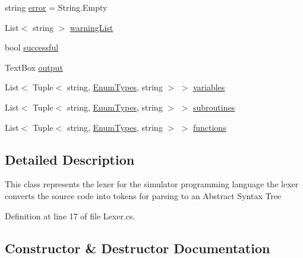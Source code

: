 \begin{DoxyCompactItemize}
\item 
string \hyperlink{class_c_p_u___o_s___simulator_1_1_compiler_1_1_frontend_1_1_lexer_a787862ffec1828f426fac010f543e31c}{error} = String.\+Empty
\item 
List$<$ string $>$ \hyperlink{class_c_p_u___o_s___simulator_1_1_compiler_1_1_frontend_1_1_lexer_ac240cede3460c43d89c4387c04f00377}{warning\+List}
\item 
bool \hyperlink{class_c_p_u___o_s___simulator_1_1_compiler_1_1_frontend_1_1_lexer_ad2b45c1eaf05bca9d992ed22a0331bae}{successful}
\item 
Text\+Box \hyperlink{class_c_p_u___o_s___simulator_1_1_compiler_1_1_frontend_1_1_lexer_ab2c4e18875ad66f9f4b1debf32e21d97}{output}
\item 
List$<$ Tuple$<$ string, \hyperlink{namespace_c_p_u___o_s___simulator_1_1_compiler_1_1_frontend_1_1_tokens_a7c0cc43763cc9d01c7d5af34d70b96ea}{Enum\+Types}, string $>$ $>$ \hyperlink{class_c_p_u___o_s___simulator_1_1_compiler_1_1_frontend_1_1_lexer_af7e42e63231b352e446b5be89623c74a}{variables}
\item 
List$<$ Tuple$<$ string, \hyperlink{namespace_c_p_u___o_s___simulator_1_1_compiler_1_1_frontend_1_1_tokens_a7c0cc43763cc9d01c7d5af34d70b96ea}{Enum\+Types}, string $>$ $>$ \hyperlink{class_c_p_u___o_s___simulator_1_1_compiler_1_1_frontend_1_1_lexer_a45c844ee9a1f5dedb94dcb4f19883d5a}{subroutines}
\item 
List$<$ Tuple$<$ string, \hyperlink{namespace_c_p_u___o_s___simulator_1_1_compiler_1_1_frontend_1_1_tokens_a7c0cc43763cc9d01c7d5af34d70b96ea}{Enum\+Types}, string $>$ $>$ \hyperlink{class_c_p_u___o_s___simulator_1_1_compiler_1_1_frontend_1_1_lexer_ab56c14f20b221345bcb9ef4bdd7d5c87}{functions}
\end{DoxyCompactItemize}


\subsection{Detailed Description}
This class represents the lexer for the simulator programming language the lexer converts the source code into tokens for parsing to an Abstract Syntax Tree 



Definition at line 17 of file Lexer.\+cs.



\subsection{Constructor \& Destructor Documentation}
\hypertarget{class_c_p_u___o_s___simulator_1_1_compiler_1_1_frontend_1_1_lexer_ad1b8ba022e0f486f963bf7f2104ef03d}{}
